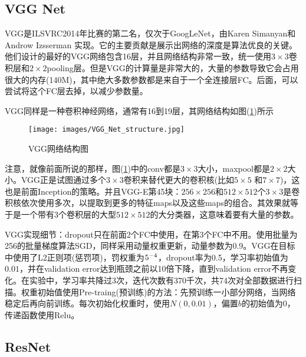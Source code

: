     \subsection{VGG Net}
        \par
        VGG是ILSVRC2014年比赛的第二名，仅次于GoogLeNet，由Karen Simanyan和Androw Izsserman 实现\cite{2014.KarenSzegedy}。它的主要贡献是展示出网络的深度是算法优良的关键。他们设计的最好的VGG网络包含16层，并且网络结构非常一致，统一使用$3\times 3$卷积层和$2\times 2$pooling层。但是VGG的计算量是非常大的，大量的参数导致它会占用很大的内存(140M)，其中绝大多数参数都是来自于一个全连接层FC。后面，可以尝试将这个FC层去掉，以减少参数量。
        \par
        VGG同样是一种卷积神经网络，通常有16到19层，其网络结构如图(\ref{fig:VGG网络结构图})所示
             \begin{figure}[H]
            \centering
            \texttt{[image: images/VGG\_Net\_structure.jpg]}
            \caption{VGG网络结构图}
            \label{fig:VGG网络结构图}
            \end{figure}
        \par
        注意，就像前面所说的那样，图(\ref{fig:VGG网络结构图})中的conv都是$3\times 3$大小，maxpool都是$2\times 2$大小。VGG正是试图通过多个$3\times 3$卷积来替代更大的卷积核(比如$5\times 5$ 和$7\times 7$)，这也是前面Inception的策略。并且VGG-E第45块：$256\times 256$和$512\times 512$个$3\times 3$是卷积核依次使用多次，以提取到更多的特征maps以及这些maps的组合。其效果就等于是一个带有3个卷积层的大型$512\times 512$的大分类器，这意味着要有大量的参数。
        \par
        VGG实现细节：dropout只在前面2个FC中使用，在第3个FC中不用。使用批量为256的批量梯度算法SGD，同样采用动量权重更新，动量参数为0.9。VGG在目标中使用了L2正则项(惩罚项)，罚权重为$5\time 10^{-4}$，dropout率为0.5，学习率初始值为$0.01$，并在validation error达到瓶颈之前以10倍下降，直到validation error不再变化。在实验中，学习率共降过3次，迭代次数有370千次，共74次对全部数据进行扫描。权重初始值使用Pre-traing(预训练)的方法：先预训练一小部分网络，当网络稳定后再向前训练。每次初始化权重时，使用$N(0,0.01)$，偏置$b$的初始值为0，传递函数使用Relu。

    \subsection{ResNet}
